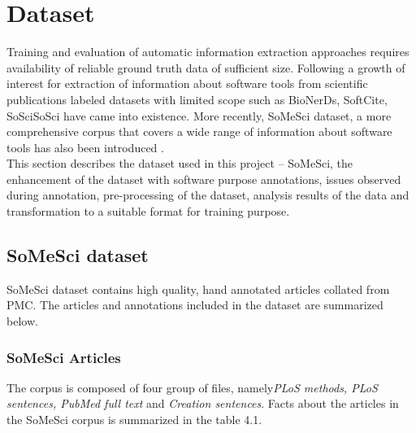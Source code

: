 \chapter{Dataset}
\label{ch:dataset}
 
%
%

Training and evaluation of automatic information extraction approaches requires availability of reliable ground truth data of sufficient size. Following a growth of interest for extraction of information about software tools from scientific publications labeled datasets with limited scope such as BioNerDs, SoftCite, SoSciSoSci have came into existence. More recently, \ac{SoMeSci} dataset, a more comprehensive corpus that covers a wide range of information about software tools has also been introduced \citep{schindler2021somesci}.  \\

This section describes the dataset used in this project – \ac{SoMeSci},  the enhancement of the dataset with software purpose annotations, issues observed during annotation, pre-processing of the dataset, analysis results of the data and transformation to a suitable format for training purpose.  


\section{SoMeSci dataset}
\label{sec:dataset:SoMeSci}

\ac{SoMeSci} dataset contains high quality, hand annotated articles collated from  \ac{PMC}. The articles and annotations included in the dataset are summarized below.  

\subsection{ SoMeSci Articles }
\label{subsec:dataset:SoMeSci:Articles}

The corpus is composed of four group of files, namely\emph{PLoS methods, PLoS sentences, PubMed full text} and \emph{Creation sentences}. Facts about the articles in the \ac{SoMeSci} corpus is summarized in the table 4.1. \\

